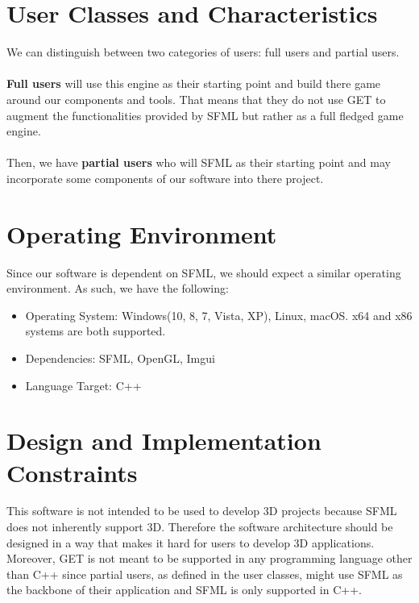 \documentclass{scrreprt}
\begin{document}
\section{User Classes and Characteristics}
We can distinguish between two categories of users: full users and partial users. \\ \\ \textbf{Full users} will use this engine as their starting point and build there game around our components and tools. That means that they do not use GET to augment the functionalities provided by SFML but rather as a full fledged game engine.\\ \\Then, we have \textbf{partial users} who will SFML as their starting point and may incorporate some components of our software into there project.


\section{Operating Environment}
Since our software is dependent on SFML, we should expect a similar operating environment. As such, we have the following:
\begin{itemize}
\item Operating System: Windows(10, 8, 7, Vista, XP), Linux, macOS. x64 and x86 systems are both supported.
\item Dependencies: SFML, OpenGL, Imgui
\item Language Target: C++
\end{itemize}



\section{Design and Implementation Constraints}
This software is not intended to be used to develop 3D projects because SFML does not inherently support 3D. Therefore the software architecture should be designed in a way that makes it hard for users to develop 3D applications. Moreover, GET is not meant to be supported in any programming language other than C++ since partial users, as defined in the user classes, might use SFML as the backbone of their application and SFML is only supported in C++.
\end{document}
